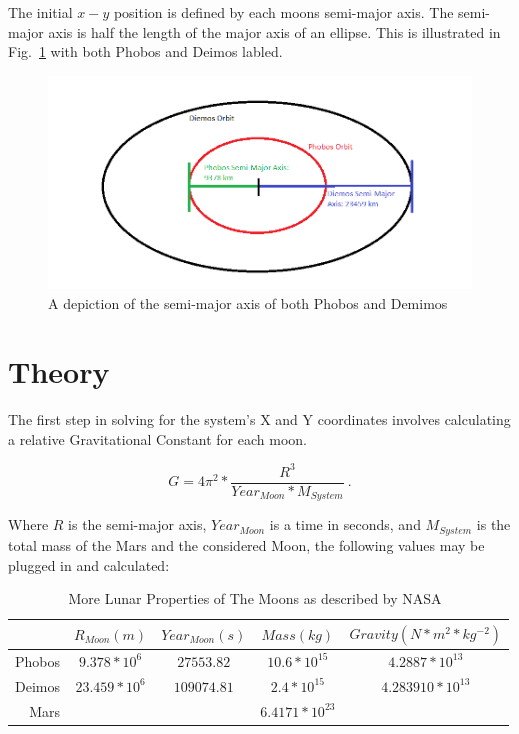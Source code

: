 \documentclass[11pt]{article}
\begin{document}
\noindent
The initial $x-y$ position is defined by each moons semi-major axis. 
The semi-major axis is half the length of the major axis of an ellipse.
This is illustrated in Fig.~\ref{fig:semi-major-axis} with both 
Phobos and Deimos labled.

\begin{figure}[ht]
  \centering
  \includegraphics[width=1.0\textwidth, angle =0]{../images/semi-major-axis}
  \caption{A depiction of the semi-major axis of both Phobos and Demimos}
  \label{fig:semi-major-axis}
\end{figure}




\section{Theory}

\noindent The first step in solving for the system's X and Y coordinates involves calculating a relative Gravitational Constant for each moon. 

\begin{equation}
\label{eq:gravConstant}
 G = 4\pi ^{2}*\frac{R^{3}}{Year_{Moon}*M_{System}}~.
\end{equation}

\noindent Where $R$ is the semi-major axis, $Year_{Moon}$ is a time in seconds, and $M_{System}$ is the total mass of the Mars and the considered Moon, the following values may be plugged in and calculated:

\begin{table}[ht]
  \centering
  \begin{tabular}{|r|c|c|c|c|}
  \hline
                             & $R_{Moon}  (m)$  &  $Year_{Moon} (s)$ & $Mass (kg)$ & $Gravity  (N*m^{2}*kg^{-2})$ \\ \hline
  Phobos                 & $9.378*10^{6}$  & $27553.82$ &  $10.6*10^{15}$ & $4.2887*10^{13}$ \\ \hline
  Deimos 		     & $23.459*10^{6}$  & $109074.81$ &  $2.4*10^{15}$ & $4.283910*10^{13}$   \\ \hline
  Mars		     &                             &                    & $6.4171*10^{23}$  &\\ \hline
  \end{tabular}
  \label{table:lunar-properties}
  \caption{More Lunar Properties of The Moons as described by NASA~\cite{nasa}}
\end{table}
\end{document}
